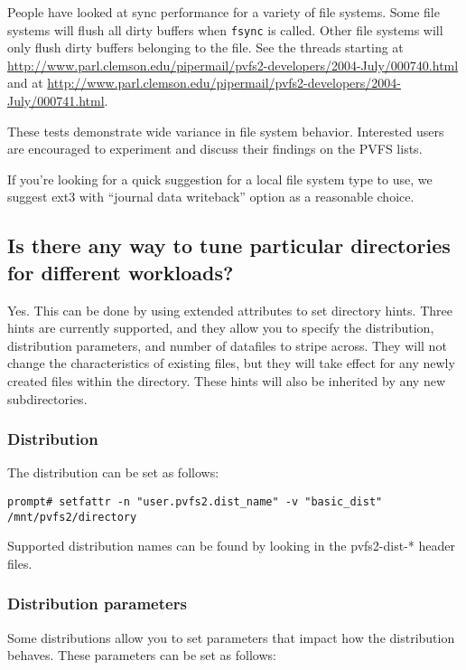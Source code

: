\documentclass[11pt,letterpaper]{article}
\begin{document}
People have looked at sync performance for a variety of file systems.
Some file systems will flush all dirty buffers when \texttt{fsync} is
called.  Other file systems will only flush dirty buffers belonging to
the file. See the threads starting at
\url{http://www.parl.clemson.edu/pipermail/pvfs2-developers/2004-July/000740.html}
and at
\url{http://www.parl.clemson.edu/pipermail/pvfs2-developers/2004-July/000741.html}.

These tests demonstrate wide variance in file system behavior.
Interested users are encouraged to experiment and discuss their
findings on the PVFS lists.

If you're looking for a quick suggestion for a local file system type
to use, we suggest ext3 with ``journal data writeback'' option as a
reasonable choice.

\subsection{Is there any way to tune particular directories for different
workloads?}
\label{sec:dir_tuning}

Yes.  This can be done by using extended attributes to set directory
hints.  Three hints are currently supported, and they allow you to specify
the distribution, distribution parameters, and number of datafiles to
stripe across.  They will not change the characteristics of existing
files, but they will take effect for any newly created files within the
directory.  These hints will also be inherited by any new
subdirectories.

\subsubsection{Distribution}

The distribution can be set as follows:

\begin{verbatim}
prompt# setfattr -n "user.pvfs2.dist_name" -v "basic_dist" /mnt/pvfs2/directory
\end{verbatim}

Supported distribution names can be found by looking in the pvfs2-dist-*
header files.

\subsubsection{Distribution parameters}

Some distributions allow you to set parameters that impact how the
distribution behaves.  These parameters can be set as follows:
\end{document}
